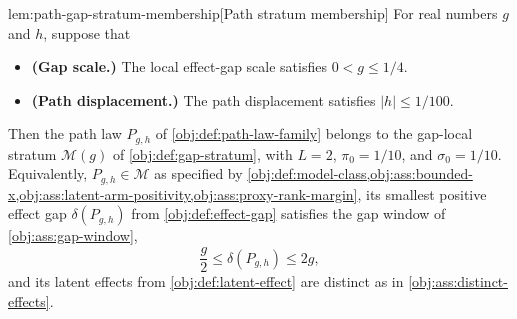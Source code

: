 \documentclass[11pt]{article}
\begin{document}
\begin{lemmav}{lem:path-gap-stratum-membership}[Path stratum membership]
For real numbers \(g\) and \(h\), suppose that
\begin{itemize}
\item \textbf{(Gap scale.)} The local effect-gap scale satisfies \(0<g\le 1/4\).
\item \textbf{(Path displacement.)} The path displacement satisfies \(|h|\le 1/100\).
\end{itemize}
Then the path law \(P_{g,h}\) of \cref{obj:def:path-law-family} belongs to the gap-local stratum \(\mathcal M(g)\) of \cref{obj:def:gap-stratum}, with \(L=2\), \(\pi_0=1/10\), and \(\sigma_0=1/10\). Equivalently, \(P_{g,h}\in\mathcal M\) as specified by \cref{obj:def:model-class,obj:ass:bounded-x,obj:ass:latent-arm-positivity,obj:ass:proxy-rank-margin}, its smallest positive effect gap \(\delta(P_{g,h})\) from \cref{obj:def:effect-gap} satisfies the gap window of \cref{obj:ass:gap-window},
\[
\frac{g}{2}\le \delta(P_{g,h})\le 2g,
\]
and its latent effects from \cref{obj:def:latent-effect} are distinct as in \cref{obj:ass:distinct-effects}.
\end{lemmav}
\end{document}
